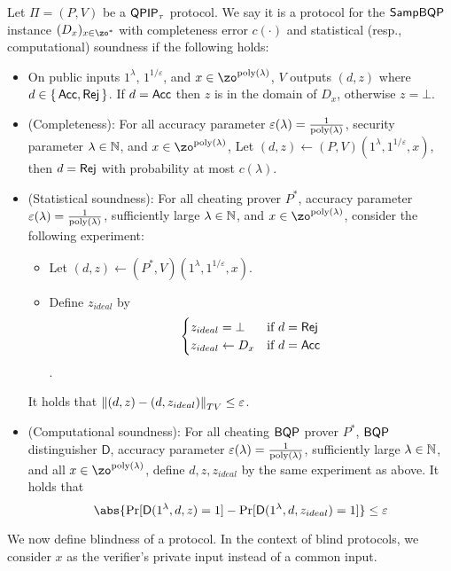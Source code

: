 \begin{definition}
	\label{dfn:stats-secure-proto-sampbqp}
	Let $\Pi=(P, V)$ be a $\operatorname{\mathsf{QPIP}}_\tau$ protocol.
	We say it is a protocol for the $\operatorname{\mathsf{SampBQP}}$ instance $(D_x)_{x\in\zo^*}$ with completeness error $c(\cdot)$ and statistical (resp., computational) soundness if the following holds:
	\begin{itemize}
		\item On public inputs $1^\lambda$, $1^{1/\varepsilon}$, and $x\in\zo^{\poly(\lambda)}$, $V$ outputs $(d, z)$ where $d\in\set{\mathsf{Acc}, \mathsf{Rej}}$. If $d=\mathsf{Acc}$ then $z$ is in the domain  of $D_x$, otherwise $z=\bot$.
		\item (Completeness):
			For all accuracy parameter $\varepsilon(\lambda)=\frac{1}{\operatorname*{\operatorname{poly}}(\lambda)}$,
			security parameter $\lambda\in\mathbb{N}$,
			and $x\in\zo^{\poly(\lambda)}$, 
			Let $(d, z)\leftarrow(P, V)(1^\lambda, 1^{1/\varepsilon}, x)$, then $d=\mathsf{Rej}$ with probability at most $c(\lambda)$.
		\item (Statistical soundness): For all cheating prover $P^*$,
		    accuracy parameter $\varepsilon(\lambda)=\frac{1}{\operatorname*{\operatorname{poly}}(\lambda)}$,
			sufficiently large $\lambda\in\mathbb{N}$, and $x\in\zo^{\poly(\lambda)}$, 
			consider the following experiment:
			\begin{itemize}
				\item Let $(d, z)\leftarrow(P^*, V)(1^\lambda, 1^{1/\varepsilon}, x)$.
				\item Define $z_{ideal}$ by
				$$\begin{cases}
					z_{ideal}=\bot & \text{if } d=\mathsf{Rej}\\
					z_{ideal}\leftarrow D_x & \text{if } d=\mathsf{Acc}
				\end{cases}$$.
			\end{itemize}
			It holds that $\left\lVert(d,z)-(d,z_{ideal})\right\rVert_{TV}\leq\varepsilon$. 
		\item (Computational soundness):
		For all cheating $\operatorname{\mathsf{BQP}}$ prover $P^*$, $\operatorname{\mathsf{BQP}}$ distinguisher $\mathsf{D}$, accuracy parameter $\varepsilon(\lambda)=\frac{1}{\operatorname*{\operatorname{poly}}(\lambda)}$,
			sufficiently large $\lambda\in\mathbb{N}$, and all $x\in\zo^{\poly(\lambda)}$, 
			define $d, z, z_{ideal}$ by the same experiment as above.
			It holds that
			$$\abs{\Pr[\mathsf{D}(1^{\lambda}, d,z) = 1] - \Pr[\mathsf{D}(1^{\lambda}, d,z_{ideal}) = 1]} \leq \varepsilon $$
	\end{itemize}
\end{definition}

We now define blindness of a protocol.
In the context of blind protocols, we consider $x$ as the verifier's private input instead of a common input.  

